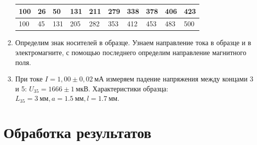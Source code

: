 \documentclass[a4paper,12pt]{article}
\begin{document}
\begin{enumerate}
\begin{table}[h]
\begin{tabular}{|l||l||l|l|l|l|l|l|l|l|}
100 & 26 & 50  & 131 & 211 & 279 & 338 & 378 & 406 & 423 \\ \hline
100 & 45 & 131 & 205 & 282 & 353 & 412 & 453 & 483 & 500 \\ \hline
\end{tabular}
\end{table}
\item Определим знак носителей в образце. Узнаем направление тока в образце и в электромагните, с помощью последнего определим направление магнитного поля.
\item При токе $I = 1,00 \pm 0,02~\text{мА}$ измеряем падение напряжения между концами 3 и 5: $U_{35} = 1666 \pm 1~\text{мкВ} $. Характеристики образца: $L_{35} = 3~\text{мм}, a = 1.5~\text{мм}, l = 1.7~\text{мм}$.
\end{enumerate}
\section*{Обработка результатов}
\end{document}
